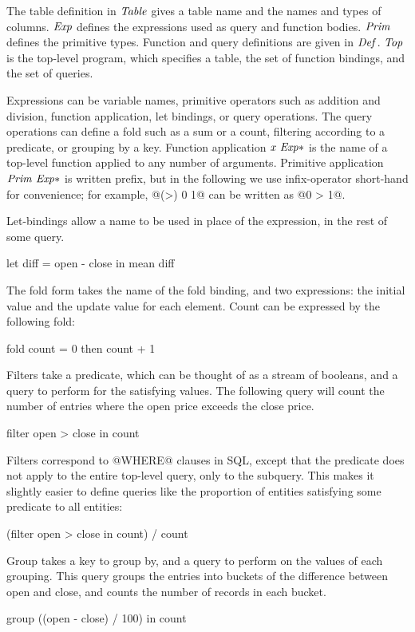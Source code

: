 The table definition in $\mathit{Table}$ gives a table name and the names and types of columns.
$\mathit{Exp}$ defines the expressions used as query and function bodies.
$\mathit{Prim}$ defines the primitive types.
Function and query definitions are given in $\mathit{Def}$.
$\mathit{Top}$ is the top-level program, which specifies a table, the set of function bindings, and the set of queries.

Expressions can be variable names, primitive operators such as addition and division, function application, let bindings, or query operations.
The query operations can define a fold such as a sum or a count, filtering according to a predicate, or grouping by a key.
Function application $\mathit{x~Exp*}$ is the name of a top-level function applied to any number of arguments.
Primitive application $\mathit{Prim~Exp*}$ is written prefix, but in the following we use infix-operator short-hand for convenience; for example, @(>) 0 1@ can be written as @0 > 1@.

Let-bindings allow a name to be used in place of the expression, in the rest of some query.
\begin{code}
let diff = open - close
in  mean diff
\end{code}

The fold form takes the name of the fold binding, and two expressions: the initial value and the update value for each element.
Count can be expressed by the following fold:
\begin{code}
fold count = 0 then count + 1
\end{code}

Filters take a predicate, which can be thought of as a stream of booleans, and a query to perform for the satisfying values.
The following query will count the number of entries where the open price exceeds the close price.
\begin{code}
filter open > close in count
\end{code}

Filters correspond to @WHERE@ clauses in SQL, except that the predicate does not apply to the entire top-level query, only to the subquery.
This makes it slightly easier to define queries like the proportion of entities satisfying some predicate to all entities: 
\begin{code}
(filter open > close in count) / count
\end{code}

Group takes a key to group by, and a query to perform on the values of each grouping.
This query groups the entries into buckets of the difference between open and close, and counts the number of records in each bucket.
\begin{code}
group ((open - close) / 100) in count
\end{code}

